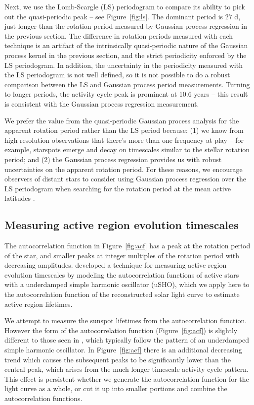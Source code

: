 Next, we use the Lomb-Scargle (LS) periodogram to compare its ability to pick out the quasi-periodic peak -- see Figure~\ref{fig:ls}. The dominant period is 27 d, just longer than the rotation period measured by Gaussian process regression in the previous section. The difference in rotation periods measured with each technique is an artifact of the intrinsically quasi-periodic nature of the Gaussian process kernel in the previous section, and the strict periodicity enforced by the LS periodogram. In addition, the uncertainty in the periodicity measured with the LS periodogram is not well defined, so it is not possible to do a robust comparison between the LS and Gaussian process period measurements. Turning to longer periods, the activity cycle peak is prominent at 10.6 years -- this result is consistent with the Gaussian process regression measurement.

We prefer the value from the quasi-periodic Gaussian process analysis for the apparent rotation period rather than the LS period because: (1) we know from high resolution observations that there's more than one frequency at play -- for example, starspots emerge and decay on timescales similar to the stellar rotation period; and (2) the Gaussian process regression provides us with robust uncertainties on the apparent rotation period. For these reasons, we encourage observers of distant stars to consider using Gaussian process regression over the LS periodogram when searching for the rotation period at the mean active latitudes \citep{VanderPlas2018}.

\subsection{Measuring active region evolution timescales}

The autocorrelation function in Figure~\ref{fig:acf} has a peak at the rotation period of the star, and smaller peaks at integer multiples of the rotation period with decreasing amplitudes. \citet{Giles2017} developed a technique for measuring active region evolution timescales by modeling the autocorrelation functions of active stars with a underdamped simple harmonic oscillator (uSHO), which we apply here to the autocorrelation function of the reconstructed solar light curve to estimate active region lifetimes. 

We attempt to measure the sunspot lifetimes from the autocorrelation function. However the form of the autocorrelation function (Figure~\ref{fig:acf}) is slightly different to those seen in \citet{Giles2017}, which typically follow the pattern of an underdamped simple harmonic oscillator. In Figure~\ref{fig:acf} there is an additional decreasing trend which causes the subsequent peaks to be significantly lower than the central peak, which arises from the much longer timescale activity cycle pattern. This effect is persistent whether we generate the autocorrelation function for the light curve as a whole, or cut it up into smaller portions and combine the autocorrelation functions. 

